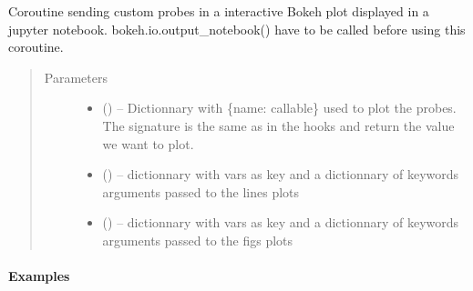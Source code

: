 \documentclass[letterpaper,10pt,english]{sphinxmanual}
\begin{document}

\begin{fulllineitems}
\label{\detokenize{triflow.plugins:triflow.plugins.displays.bokeh_probes_update}}
Coroutine sending custom probes in a interactive Bokeh plot displayed in a jupyter notebook.
bokeh.io.output\_notebook() have to be called before using this coroutine.
\begin{quote}\begin{description}
\item[{Parameters}] \leavevmode\begin{itemize}
\item {} 
 () -- Dictionnary with \{name: callable\} used to plot the probes. The signature is the same as in the hooks and return the value we want to plot.

\item {} 
 () -- dictionnary with vars as key and a dictionnary of keywords arguments passed to the lines plots

\item {} 
 () -- dictionnary with vars as key and a dictionnary of keywords arguments passed to the figs plots

\end{itemize}

\end{description}\end{quote}
\paragraph{Examples}

\begin{sphinxVerbatim}[commandchars=\\\{\}]
     
   
\end{sphinxVerbatim}


\end{fulllineitems}
\end{document}
